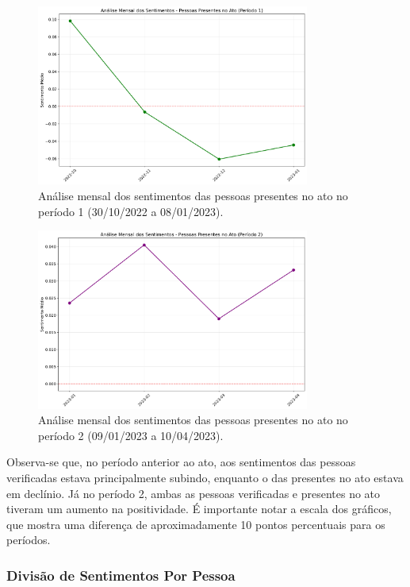 \documentclass[manuscript,screen,review]{acmart}
\begin{document}
\begin{figure}[h]
\centering
\includegraphics[width=0.8\textwidth]{figura7_sentimentos_presentes_mensal_periodo1.png}
\caption{Análise mensal dos sentimentos das pessoas presentes no ato no período 1 (30/10/2022 a 08/01/2023).}
\label{fig:figura7}
\end{figure}

\begin{figure}[h]
\centering
\includegraphics[width=0.8\textwidth]{figura8_sentimentos_presentes_mensal_periodo2.png}
\caption{Análise mensal dos sentimentos das pessoas presentes no ato no período 2 (09/01/2023 a 10/04/2023).}
\label{fig:figura8}
\end{figure}

Observa-se que, no período anterior ao ato, aos sentimentos das pessoas verificadas estava principalmente subindo, enquanto o das presentes no ato estava em declínio. Já no período 2, ambas as pessoas verificadas e presentes no ato tiveram um aumento na positividade. É importante notar a escala dos gráficos, que mostra uma diferença de aproximadamente 10 pontos percentuais para os períodos.

\subsubsection{Divisão de Sentimentos Por Pessoa}
\end{document}
